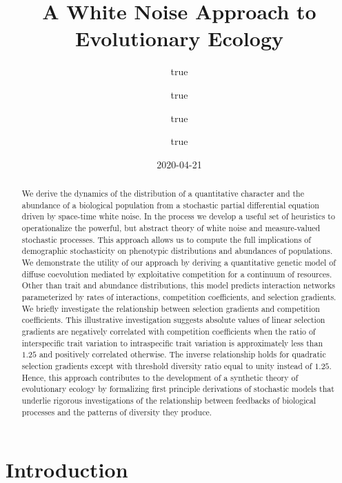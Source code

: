 \documentclass[]{article}
\title{A White Noise Approach to Evolutionary Ecology}
\author{true \and true \and true \and true}
\date{2020-04-21}
\begin{document}
\maketitle
\begin{abstract}
We derive the dynamics of the distribution of a quantitative character
and the abundance of a biological population from a stochastic partial
differential equation driven by space-time white noise. In the process
we develop a useful set of heuristics to operationalize the powerful,
but abstract theory of white noise and measure-valued stochastic
processes. This approach allows us to compute the full implications of
demographic stochasticity on phenotypic distributions and abundances of
populations. We demonstrate the utility of our approach by deriving a
quantitative genetic model of diffuse coevolution mediated by
exploitative competition for a continuum of resources. Other than trait
and abundance distributions, this model predicts interaction networks
parameterized by rates of interactions, competition coefficients, and
selection gradients. We briefly investigate the relationship between
selection gradients and competition coefficients. This illustrative
investigation suggests absolute values of linear selection gradients are
negatively correlated with competition coefficients when the ratio of
interspecific trait variation to intraspecific trait variation is
approximately less than \(1.25\) and positively correlated otherwise.
The inverse relationship holds for quadratic selection gradients except
with threshold diversity ratio equal to unity instead of \(1.25\).
Hence, this approach contributes to the development of a synthetic
theory of evolutionary ecology by formalizing first principle
derivations of stochastic models that underlie rigorous investigations
of the relationship between feedbacks of biological processes and the
patterns of diversity they produce.
\end{abstract}

\hypertarget{introduction}{%
\section{Introduction}\label{introduction}}
\end{document}
